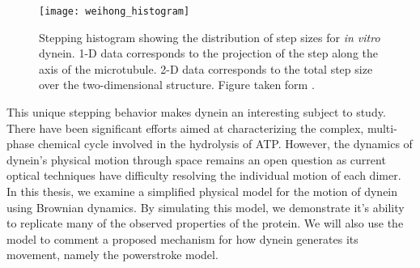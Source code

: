 \begin{figure}[!hbt]
	\centering
	\texttt{[image: weihong\_histogram]}
	\caption{Stepping histogram showing the distribution of step sizes for \textit{in vitro} dynein. 1-D data corresponds to the projection of the step along the axis of the microtubule. 2-D data corresponds to the total step size over the two-dimensional structure. Figure taken form \cite{qiu2012dynein}.}  
	\label{fig:weihong histogram} 
\end{figure}

This unique stepping behavior makes dynein an interesting subject to study. There have been significant efforts aimed at characterizing the complex, multi-phase chemical cycle involved in the hydrolysis of ATP\cite{cianfrocco2015mechanism}. However, the dynamics of dynein's physical motion through space remains an open question as current optical techniques have difficulty resolving the individual motion of each dimer. In this thesis, we examine a simplified physical model for the motion of dynein using Brownian dynamics. By simulating this model, we demonstrate it's ability to replicate many of the observed properties of the protein. We will also use the model to comment a proposed mechanism for how dynein generates its movement, namely the powerstroke model. 

